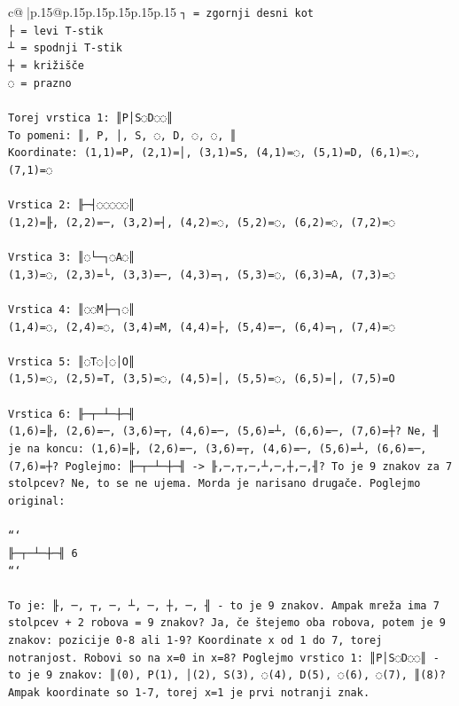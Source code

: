 \documentclass{article}
\begin{document}
{\begin{supertabular}{c@{$\;$}|p{.15\linewidth}@{}p{.15\linewidth}p{.15\linewidth}p{.15\linewidth}p{.15\linewidth}p{.15\linewidth}}
{{{\texttt{┐ = zgornji desni kot} \\
\texttt{├ = levi T{-}stik} \\
\texttt{┴ = spodnji T{-}stik} \\
\texttt{┼ = križišče} \\
\texttt{◌ = prazno} \\
\\ 
\texttt{Torej vrstica 1: ║P│S◌D◌◌║} \\
\texttt{To pomeni: ║, P, │, S, ◌, D, ◌, ◌, ║} \\
\texttt{Koordinate: (1,1)=P, (2,1)=│, (3,1)=S, (4,1)=◌, (5,1)=D, (6,1)=◌, (7,1)=◌} \\
\\ 
\texttt{Vrstica 2: ╟─┤◌◌◌◌◌║} \\
\texttt{(1,2)=╟, (2,2)=─, (3,2)=┤, (4,2)=◌, (5,2)=◌, (6,2)=◌, (7,2)=◌} \\
\\ 
\texttt{Vrstica 3: ║◌└─┐◌A◌║} \\
\texttt{(1,3)=◌, (2,3)=└, (3,3)=─, (4,3)=┐, (5,3)=◌, (6,3)=A, (7,3)=◌} \\
\\ 
\texttt{Vrstica 4: ║◌◌M├─┐◌║} \\
\texttt{(1,4)=◌, (2,4)=◌, (3,4)=M, (4,4)=├, (5,4)=─, (6,4)=┐, (7,4)=◌} \\
\\ 
\texttt{Vrstica 5: ║◌T◌│◌│O║} \\
\texttt{(1,5)=◌, (2,5)=T, (3,5)=◌, (4,5)=│, (5,5)=◌, (6,5)=│, (7,5)=O} \\
\\ 
\texttt{Vrstica 6: ╟─┬─┴─┼─╢} \\
\texttt{(1,6)=╟, (2,6)=─, (3,6)=┬, (4,6)=─, (5,6)=┴, (6,6)=─, (7,6)=┼? Ne, ╢ je na koncu: (1,6)=╟, (2,6)=─, (3,6)=┬, (4,6)=─, (5,6)=┴, (6,6)=─, (7,6)=┼? Poglejmo: ╟─┬─┴─┼─╢ {-}> ╟,─,┬,─,┴,─,┼,─,╢? To je 9 znakov za 7 stolpcev? Ne, to se ne ujema. Morda je narisano drugače. Poglejmo original:} \\
\\ 
\texttt{```} \\
\texttt{╟─┬─┴─┼─╢ 6} \\
\texttt{```} \\
\\ 
\texttt{To je: ╟, ─, ┬, ─, ┴, ─, ┼, ─, ╢ {-} to je 9 znakov. Ampak mreža ima 7 stolpcev + 2 robova = 9 znakov? Ja, če štejemo oba robova, potem je 9 znakov: pozicije 0{-}8 ali 1{-}9? Koordinate x od 1 do 7, torej notranjost. Robovi so na x=0 in x=8? Poglejmo vrstico 1: ║P│S◌D◌◌║ {-} to je 9 znakov: ║(0), P(1), │(2), S(3), ◌(4), D(5), ◌(6), ◌(7), ║(8)? Ampak koordinate so 1{-}7, torej x=1 je prvi notranji znak.} \\
}}}
\end{supertabular}}
\end{document}
